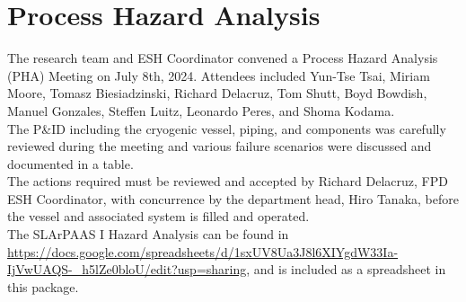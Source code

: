 \section{Process Hazard Analysis}
\label{sec:hazard_ana}

The research team and ESH Coordinator convened a Process Hazard Analysis (PHA) 
Meeting on July 8th, 2024. 
Attendees included Yun-Tse Tsai, Miriam Moore, Tomasz Biesiadzinski, Richard Delacruz,
Tom Shutt, Boyd Bowdish, Manuel Gonzales, Steffen Luitz, Leonardo Peres, and Shoma Kodama.\\

The P\&ID including the cryogenic vessel, piping, and components was carefully reviewed 
during the meeting and various failure scenarios were discussed and documented in a table.\\

The actions required must be reviewed and accepted by Richard Delacruz, FPD ESH Coordinator, 
with concurrence by the department head, Hiro Tanaka, before the vessel and associated 
system is filled and operated.\\

The SLArPAAS I Hazard Analysis can be found in
\url{https://docs.google.com/spreadsheets/d/1sxUV8Ua3J8l6XIYgdW33Ia-IjVwUAQS-_h5lZe0bloU/edit?usp=sharing},
and is included as a spreadsheet in this package.
